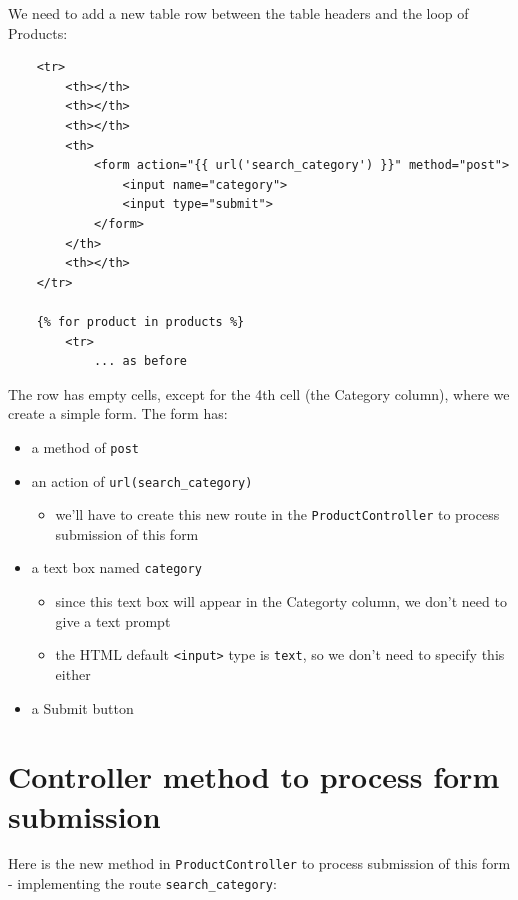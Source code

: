 \documentclass[a4paperpaper,openright]{book}
\providecommand{\tightlist}{%
  \setlength{\itemsep}{0pt}\setlength{\parskip}{0pt}}
\begin{document}
We need to add a new table row between the table headers and the loop of
Products:

\begin{verbatim}
    <tr>
        <th></th>
        <th></th>
        <th></th>
        <th>
            <form action="{{ url('search_category') }}" method="post">
                <input name="category">
                <input type="submit">
            </form>
        </th>
        <th></th>
    </tr>

    {% for product in products %}
        <tr>
            ... as before
\end{verbatim}

The row has empty cells, except for the 4th cell (the Category column),
where we create a simple form. The form has:

\begin{itemize}
\item
  a method of \texttt{post}
\item
  an action of
  \texttt{url(\textquotesingle{}search\_category\textquotesingle{})}

  \begin{itemize}
  \tightlist
  \item
    we'll have to create this new route in the
    \texttt{ProductController} to process submission of this form
  \end{itemize}
\item
  a text box named \texttt{category}

  \begin{itemize}
  \item
    since this text box will appear in the Categorty column, we don't
    need to give a text prompt
  \item
    the HTML default \texttt{\textless{}input\textgreater{}} type is
    \texttt{text}, so we don't need to specify this either
  \end{itemize}
\item
  a Submit button
\end{itemize}

\hypertarget{controller-method-to-process-form-submission}{%
\section{Controller method to process form
submission}\label{controller-method-to-process-form-submission}}

Here is the new method in \texttt{ProductController} to process
submission of this form - implementing the route
\texttt{search\_category}:
\end{document}
